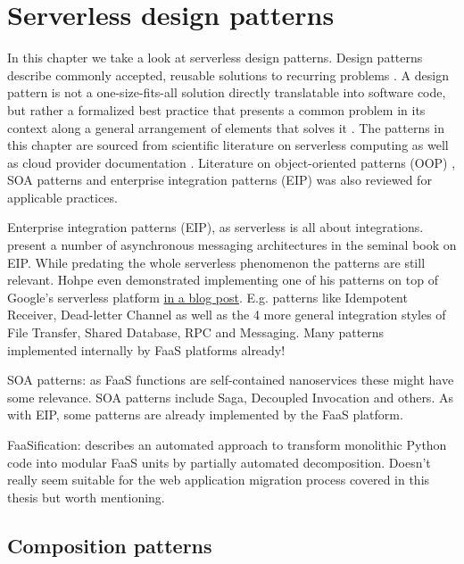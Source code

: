 \chapter{Serverless design patterns} \label{cha:patterns}

In this chapter we take a look at serverless design patterns. Design patterns describe commonly accepted, reusable solutions to recurring problems \parencite{hohpe2004enterprise}. A design pattern is not a one-size-fits-all solution directly translatable into software code, but rather a formalized best practice that presents a common problem in its context along a general arrangement of elements that solves it \parencite{gamma94designPatterns}. The patterns in this chapter are sourced from scientific literature on serverless computing as well as cloud provider documentation \parencite{aws18serverlessLens}. Literature on object-oriented patterns (OOP) \parencite{gamma94designPatterns}, SOA patterns \parencite{rotem12soa} and enterprise integration patterns (EIP) \parencite{hohpe2004enterprise} was also reviewed for applicable practices.

Enterprise integration patterns (EIP), as serverless is all about integrations. \textcite{hohpe2004enterprise} present a number of asynchronous messaging architectures in the seminal book on EIP. While predating the whole serverless phenomenon the patterns are still relevant. Hohpe even demonstrated implementing one of his patterns on top of Google's serverless platform \href{http://www.enterpriseintegrationpatterns.com/ramblings/google_cloud_functions.html}{in a blog post}. E.g. patterns like Idempotent Receiver, Dead-letter Channel as well as the 4 more general integration styles of File Transfer, Shared Database, RPC and Messaging. Many patterns implemented internally by FaaS platforms already!

SOA patterns: as FaaS functions are self-contained nanoservices these might have some relevance. SOA patterns \parencite{rotem12soa} include Saga, Decoupled Invocation and others. As with EIP, some patterns are already implemented by the FaaS platform.

FaaSification: \textcite{spillner17transformpython} describes an automated approach to transform monolithic Python code into modular FaaS units by partially automated decomposition. Doesn't really seem suitable for the web application migration process covered in this thesis but worth mentioning.

\section{Composition patterns} \label{sec:compositionPatterns}

